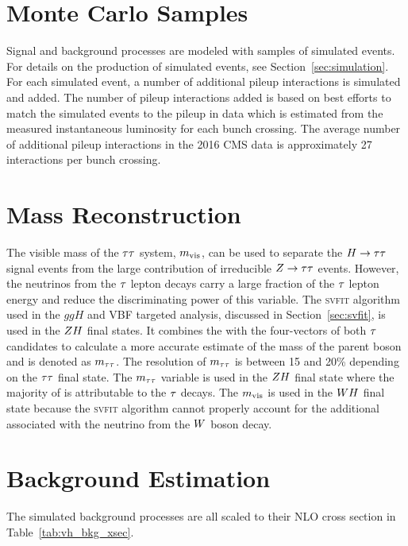\section{Monte Carlo Samples}
\label{sec:vh_mc_samples}
Signal and background processes are modeled with samples of simulated events.
For details on the production of simulated events, see Section~\ref{sec:simulation}.
For each simulated event, a number of additional pileup interactions is simulated and added. 
The number of pileup interactions added is based on best efforts to match the simulated
events to the pileup in data which is estimated from the measured instantaneous
luminosity for each bunch crossing. The average number of additional pileup interactions in
the 2016 CMS data is approximately 27 interactions per bunch crossing.



\section{Mass Reconstruction}
The visible mass of the $\tau\tau$ system, $m_\text{vis}$, can be used to separate
the $H\to\tau\tau$ signal events
from the large contribution of irreducible $Z \to \tau \tau$ events.
However, the neutrinos from the $\tau$ lepton decays carry a large fraction of
the $\tau$ lepton energy and reduce the discriminating power of this variable.
The \textsc{svfit} algorithm used in the $ggH$ and VBF targeted analysis,
discussed in Section~\ref{sec:svfit}, is used in the $ZH$ final states.
It combines the \etvecmiss 
with the four-vectors of both $\tau$ candidates to calculate a more accurate 
estimate of the mass of the parent boson and is denoted as $m_{\tau\tau}$. The resolution 
of $m_{\tau\tau}$ is between 15 and 20\% depending on the $\tau\tau$ final state. The 
$m_{\tau\tau}$ variable is used in the $ZH$ final state where the majority of 
\etvecmiss is attributable to the $\tau$ decays. The $m_\text{vis}$ is used in the 
$WH$ final state because the \textsc{svfit} algorithm cannot properly account for the 
additional \etvecmiss associated with the neutrino from the $W$ boson decay. 



\section{Background Estimation}
\label{sec:vh_background_estimation}
The simulated background processes are all scaled to their NLO cross section in Table~\ref{tab:vh_bkg_xsec}.

